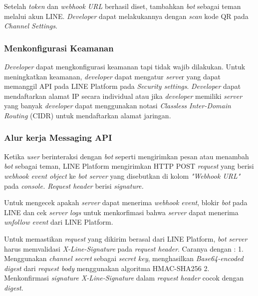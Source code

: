 Setelah \textit{token} dan \textit{webhook URL} berhasil diset, tambahkan \textit{bot} sebagai teman melalui akun LINE. \textit{Developer} dapat melakukannya dengan \textit{scan} kode QR pada \textit{Channel Settings}.

\subsubsection{Menkonfigurasi Keamanan}
\textit{Developer} dapat mengkonfigurasi keamanan tapi tidak wajib dilakukan. Untuk meningkatkan keamanan, \textit{developer} dapat mengatur \textit{serve}r yang dapat memanggil API pada LINE Platform pada \textit{Security settings}. \textit{Developer} dapat mendaftarkan alamat IP secara individual atau jika \textit{developer} memiliki \textit{server} yang banyak \textit{developer} dapat menggunakan notasi \textit{Classless Inter-Domain Routing} (CIDR) untuk mendaftarkan alamat jaringan.

\subsubsection{Alur kerja Messaging API}
Ketika \textit{user} berinteraksi dengan \textit{bot} seperti mengirimkan pesan atau menambah \textit{bot} sebagai teman, LINE Platform mengirimkan HTTP POST \textit{request} yang berisi \textit{webhook event object} ke \textit{bot server} yang disebutkan di kolom \textit{"Webhook URL"} pada \textit{console. Request header} berisi \textit{signature.} 

Untuk mengecek apakah \textit{server} dapat menerima \textit{webhook event}, blokir \textit{bot} pada LINE dan cek \textit{server logs} untuk menkorfimasi bahwa \textit{server} dapat menerima \textit{unfollow event} dari LINE Platform.

Untuk memastikan \textit{request} yang dikirim berasal dari LINE Platform, \textit{bot server} harus memvalidasi \textit{X-Line-Signature} pada \textit{request header}. Caranya dengan :
1. Menggunakan \textit{channel secret} sebagai \textit{secret key}, menghasilkan \textit{Base64-encoded digest} dari \textit{request body} menggunakan algoritma HMAC-SHA256
2. Menkonfirmasi \textit{signature X-Line-Signature} dalam \textit{request header} cocok dengan \textit{digest}.
 

